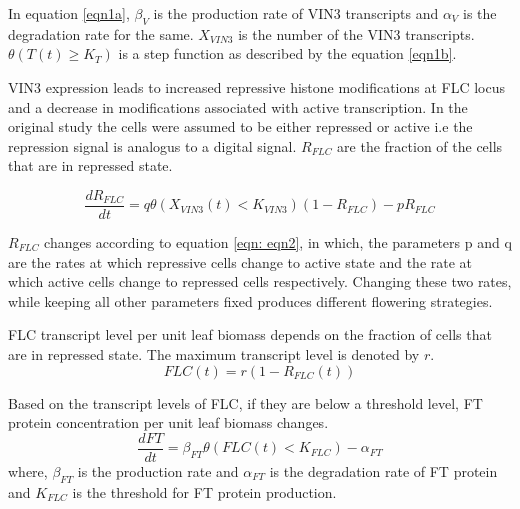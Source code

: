 \documentclass[10 pt]{article}
\begin{document}
In equation \ref{eqn1a}, $\beta_{V}$ is the production rate of VIN3 transcripts and $\alpha_{V}$ is the degradation rate for the same. $X_{VIN3}$ is the number of the VIN3 transcripts. $\theta(T(t) \ge K_{T})$ is a step function as described by the equation \ref{eqn1b}.

VIN3 expression leads to increased repressive histone modifications at FLC locus and a decrease in modifications associated with active transcription. In the original study the cells were assumed to be either repressed or active i.e the repression signal is analogus to a digital signal. $R_{FLC}$ are the fraction of the cells that are in repressed state. 

\begin{equation} 
\label{eqn: eqn2}
	\frac{dR_{FLC}}{dt} = q \theta(X_{VIN3}(t) < K_{VIN3}) (1 - R_{FLC}) - p R_{FLC}
\end{equation} 

$R_{FLC}$ changes according to equation \ref{eqn: eqn2}, in which, the parameters p and q are the rates at which repressive cells change to active state and the rate at which active cells change to repressed cells respectively. Changing these two rates, while keeping all other parameters fixed produces different flowering strategies.

FLC transcript level per unit leaf biomass depends on the fraction of cells that are in repressed state. The maximum transcript level is denoted by $r$. 
\begin{equation} \label{eqn3}
FLC(t) = r(1-R_{FLC}(t))
\end{equation}

Based on the transcript levels of FLC, if they are below a threshold level, FT protein concentration per unit leaf biomass changes.
\begin{equation}\label{eqn4}
\frac{dFT}{dt} = \beta_{FT}\theta(FLC(t) < K_{FLC}) - \alpha_{FT}
\end{equation}
where, $\beta_{FT}$ is the production rate and $\alpha_{FT}$ is the degradation rate of FT protein and $K_{FLC}$ is the threshold for FT protein production. 
\end{document}
